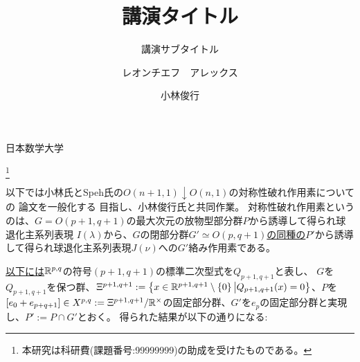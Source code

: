 \documentclass[10pt]{msjproc} %
\newcommand{\assign}{:=}
\begin{document}
  \title{講演タイトル}
  \subtitle{講演サブタイトル}

  \author{レオンチエフ　アレックス}{日本数学大学}
  \address{〒110-0016 東京都台東区台東1-34-8　日本数学大学 大学院理学研究科}

  \author{小林俊行}{}


  \thanks{本研究は科研費(課題番号:99999999)の助成を受けたものである。}

  \maketitle

{以下で}は小林氏とSpeh氏の$O(n+1,1)\downarrow O(n,1)$の対称性破れ作用素についての
論文\cite{kobayashi2015symmetry}を一般化する
目指し、小林俊行氏と共同作業。
対称性破れ作用素というのは、$G=O(p+1,q+1)$の最大次元の放物型部分群$P$から誘導して得られ球退化主系列表現
$I(\lambda)$から、$G$の閉部分群$G'\simeq O(p,q+1)$\uline{の同種の}$P'$から誘導して得られ球退化主系列表現$J(\nu)$への$G'$絡み作用素である。

\uline{以下には}$\mathbb{R}^{p,q}$の符号$(p+1,q+1)$の標準二次型式を$Q_{p+1,q+1}$と表し、
$G$を$Q_{p+1,q+1}$を保つ群、$\Xi^{p+1,q+1}:=\left\{x\in\mathbb{R}^{p+1,q+1}\setminus\left\{ 0 \right\}\big| Q_{p+1,q+1}(x)=0\right\}$、$P$を
$[e_0+e_{p+q+1}]\in X^{p,q}:=\Xi^{p+1,q+1}/\mathbb{R}^{\times}$の固定部分群、$G'$を$e_p$の固定部分群と実現し、$P':=P\cap G'$とおく。
得られた結果が以下の通りになる:
\end{document}
